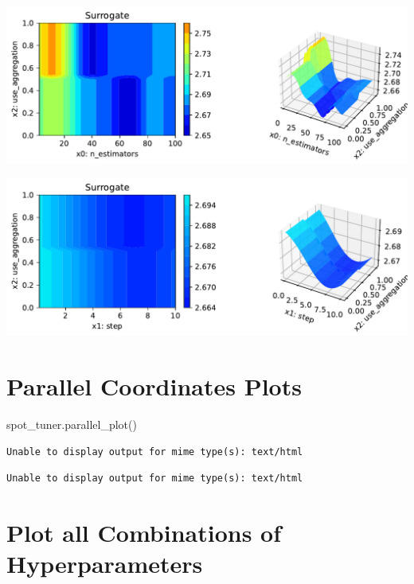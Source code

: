 \documentclass[
  letterpaper,
  DIV=11,
  numbers=noendperiod]{scrreprt}
\newenvironment{Shaded}{\begin{snugshade}}{\end{snugshade}}
\newcommand{\NormalTok}[1]{\textcolor[rgb]{0.00,0.23,0.31}{#1}}
\begin{document}
\includegraphics{025_spot_hpt_river_friedman_amfr_files/figure-pdf/cell-36-output-3.pdf}

\includegraphics{025_spot_hpt_river_friedman_amfr_files/figure-pdf/cell-36-output-4.pdf}

\section{Parallel Coordinates Plots}\label{parallel-coordinates-plots-1}

\begin{Shaded}
\begin{Highlighting}[]
\NormalTok{spot\_tuner.parallel\_plot()}
\end{Highlighting}
\end{Shaded}

\begin{verbatim}
Unable to display output for mime type(s): text/html
\end{verbatim}

\begin{verbatim}
Unable to display output for mime type(s): text/html
\end{verbatim}

\section{Plot all Combinations of
Hyperparameters}\label{plot-all-combinations-of-hyperparameters-1}
\end{document}
